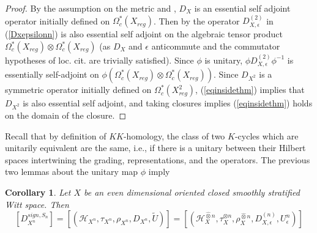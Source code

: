 \documentclass[11pt,leqno,twoside]{amsart}
\theoremstyle{plainsl}
\newtheorem{corollary}[theorem]{Corollary}
\theoremstyle{definition}
\begin{document}
\begin{proof}
  By the assumption on the metric  and \cite[Thm~1.1]{ALMP}, $D_X$ is an   essential self adjoint operator initially defined on
$\Omega_c^*(X_{reg})$.  Then by \cite[Prop.~3.6 and Cor.~3.7]{SV} the operator  $D^{(2)}_{X,\epsilon}$ in (\ref{Dxepsilonn})  is also essential self adjoint on the algebraic  tensor product  $\Omega^*_{c}(X_{reg})\otimes \Omega^*_{c}(X_{reg})$ (as $D_X$ and $\epsilon$ anticommute and the commutator hypotheses of loc. cit. are trivially satisfied). Since $\phi$ is unitary, $ \phi D^{(2)}_{X,\epsilon}  \phi^{-1}$ is  essentially self-adjoint on $\phi(\Omega^*_{c}(X_{reg})\otimes \Omega^*_{c}(X_{reg}))$. Since $D_{X^2}$ is a symmetric operator initially defined on $\Omega^*_{c}(X^2_{reg})$, (\ref{eqinsidethm}) implies that $D_{X^2}$ is also essential self adjoint, and taking closures implies (\ref{eqinsidethm}) holds on the domain of the closure.
\end{proof}





























Recall  that by definition of $KK$-homology, the class of    two $K$-cycles which are unitarily equivalent are the same, i.e.,  if there is a unitary between their Hilbert spaces intertwining the grading, representations, and the operators. The previous two lemmas about the  unitary map $\phi$ imply


\begin{corollary}
    Let $X$ be an even dimensional oriented closed smoothly stratified Witt space. Then 
    \begin{equation}\label{cartesiansignkcycle}
    \left[D^{sign,S_n}_{X^n}\right]=\left[ (\mathcal{H}_{X^n},\tau_{X^n},\rho_{X^n},D_{X^n},  \widetilde{U})   \right]  =\left[(\mathcal{H}_X^{\widehat{\otimes}n},
\tau_X^{\otimes n},\rho^{\widehat{\otimes}n}_{X},
D_{X,\epsilon}^{(n)},U^n_{\epsilon})\right]
\end{equation}
\end{corollary}
\end{document}
